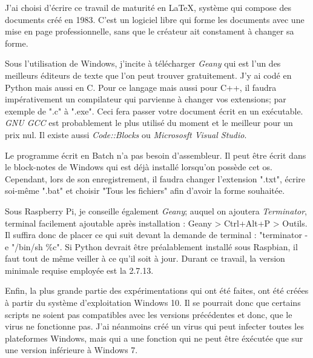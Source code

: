 J'ai choisi d'écrire ce travail de maturité	en \LaTeX, système qui compose des documents créé en 1983. C'est un logiciel libre qui forme les documents avec une mise en page professionnelle, sans que le créateur ait constament à changer sa forme.  

Sous l'utilisation de Windows, j'incite à télécharger \textit{Geany} qui est l'un des meilleurs éditeurs de texte que l'on peut trouver gratuitement. J'y ai codé en Python mais aussi en C. Pour ce langage mais aussi pour C++, il faudra impérativement un compilateur qui parvienne à changer vos extensions; par exemple de ".c" à ".exe". Ceci fera passer votre document écrit en un exécutable. \textit{GNU GCC} est probablement le plus utilisé du moment et le meilleur pour un prix nul. Il existe aussi \textit{Code::Blocks} ou \textit{Micrososft Visual Studio}.
 
Le programme écrit en Batch n'a pas besoin d'assembleur. Il peut être écrit dans le block-notes de Windows qui est déjà installé lorsqu'on possède cet os. Cependant, lors de son enregistrement, il faudra changer l'extension ".txt", écrire soi-même ".bat" et choisir "Tous les fichiers" afin d'avoir la forme souhaitée. 

Sous Raspberry Pi, je conseille également \textit{Geany}; auquel on ajoutera \textit{Terminator}, terminal facilement ajoutable après installation : Geany > Ctrl+Alt+P > Outils. Il suffira donc de placer ce qui suit devant la demande de terminal : "terminator -e "/bin/sh \%c".
Si Python devrait être préalablement installé sous Raspbian, il faut tout de même veiller à ce qu'il soit à jour. Durant ce travail, la version minimale requise employée est la 2.7.13. 

Enfin, la plus grande partie des expérimentations qui ont été faites, ont été créées à partir du système d'exploitation Windows 10. Il se pourrait donc que certains scripts ne soient pas compatibles avec les versions précédentes et donc, que le virus ne fonctionne pas. J'ai néanmoins créé un virus qui peut infecter toutes les plateformes Windows, mais qui a une fonction qui ne peut être éxécutée que sur une version inférieure à Windows 7.
   

